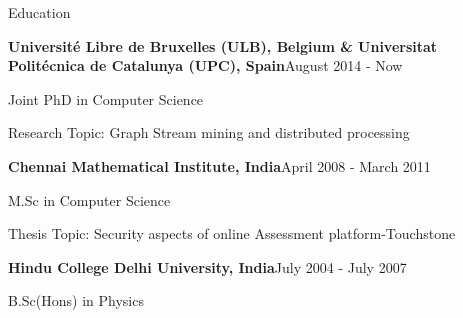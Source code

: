 \documentclass{resume} %
\begin{document}
\begin{rSection}{Education}
\begin{rSubsection}{\bf Universit\'{e} Libre de Bruxelles (ULB), Belgium \&  Universitat Polit\'{e}cnica de Catalunya (UPC), Spain}{August 2014 - Now}{}{}  
\item Joint PhD in Computer Science 
\item Research Topic: Graph Stream mining and distributed processing
\end{rSubsection}
\begin{rSubsection}{\bf Chennai Mathematical Institute, India}{April 2008 - March 2011}{}{}  
\item M.Sc in Computer Science 
\item Thesis Topic: Security aspects of online Assessment platform-Touchstone
\end{rSubsection}
\begin{rSubsection}{\bf Hindu College Delhi University, India}{July 2004 - July 2007}{}{}  
\item B.Sc(Hons) in Physics
\end{rSubsection}
\end{rSection}
\end{document}
